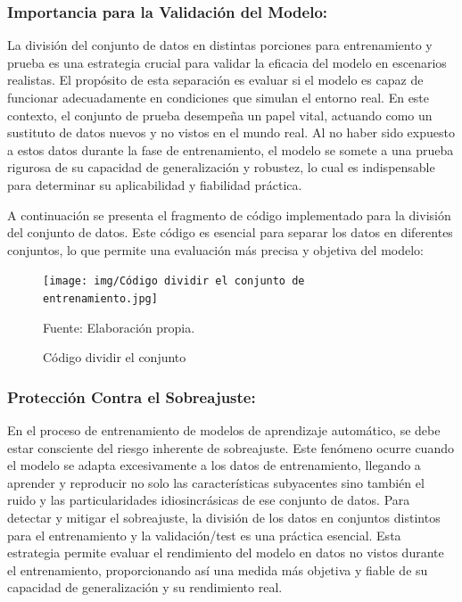 \subsubsection{Importancia para la Validación del Modelo:}
La división del conjunto de datos en distintas porciones para entrenamiento y prueba es una estrategia crucial para validar la eficacia del modelo en escenarios realistas. El propósito de esta separación es evaluar si el modelo es capaz de funcionar adecuadamente en condiciones que simulan el entorno real. En este contexto, el conjunto de prueba desempeña un papel vital, actuando como un sustituto de datos nuevos y no vistos en el mundo real. Al no haber sido expuesto a estos datos durante la fase de entrenamiento, el modelo se somete a una prueba rigurosa de su capacidad de generalización y robustez, lo cual es indispensable para determinar su aplicabilidad y fiabilidad práctica.

A continuación se presenta el fragmento de código implementado para la división del conjunto de datos. Este código es esencial para separar los datos en diferentes conjuntos, lo que permite una evaluación más precisa y objetiva del modelo:

\begin{figure}[H]
    \begin{minipage}[t]{0.9\textwidth}
        \caption{Código dividir el conjunto}
        \label{dividir_conjunto}        
    \end{minipage}

    \vspace{10pt}

    \begin{minipage}[b]{1\textwidth}
        \centering
        \texttt{[image: img/Código dividir el conjunto de entrenamiento.jpg]}        
    \end{minipage}

    \begin{minipage}[t]{0.9\textwidth}
        Fuente: Elaboración propia.
    \end{minipage}
\end{figure}

\subsubsection{Protección Contra el Sobreajuste:}
En el proceso de entrenamiento de modelos de aprendizaje automático, se debe estar consciente del riesgo inherente de sobreajuste. Este fenómeno ocurre cuando el modelo se adapta excesivamente a los datos de entrenamiento, llegando a aprender y reproducir no solo las características subyacentes sino también el ruido y las particularidades idiosincrásicas de ese conjunto de datos. Para detectar y mitigar el sobreajuste, la división de los datos en conjuntos distintos para el entrenamiento y la validación/test es una práctica esencial. Esta estrategia permite evaluar el rendimiento del modelo en datos no vistos durante el entrenamiento, proporcionando así una medida más objetiva y fiable de su capacidad de generalización y su rendimiento real.

